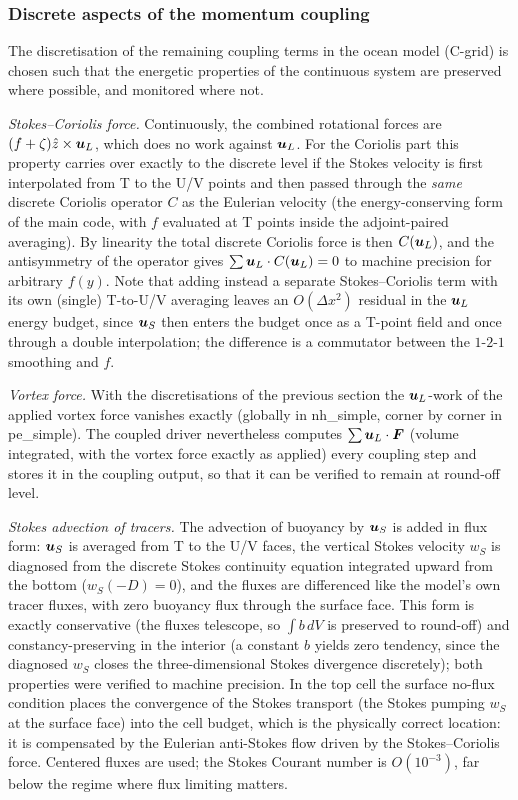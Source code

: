 \documentclass[12pt]{article}
\renewcommand{\v}[1]{{\mbox{\boldmath$ #1 $}}}  %
\begin{document}
\subsubsection*{Discrete aspects of the momentum coupling}

The discretisation of the remaining coupling terms in the ocean model
(C-grid) is chosen such that the energetic properties of the continuous
system are preserved where possible, and monitored where not.

\emph{Stokes--Coriolis force.} Continuously, the combined rotational forces are
$(f+\zeta)\hat z\times\v u_L$, which does no work against $\v u_L$. For the
Coriolis part this property carries over exactly to the discrete level if the
Stokes velocity is first interpolated from T to the U/V points and then passed
through the \emph{same} discrete Coriolis operator $C$ as the Eulerian
velocity (the energy-conserving form of the main code, with $f$ evaluated at
T points inside the adjoint-paired averaging). By linearity the total discrete
Coriolis force is then $C(\v u_L)$, and the antisymmetry of the operator gives
$\sum \v u_L\cdot C(\v u_L)=0$ to machine precision for arbitrary $f(y)$. Note
that adding instead a separate Stokes--Coriolis term with its own (single)
T-to-U/V averaging leaves an $O(\Delta x^2)$ residual in the $\v u_L$ energy
budget, since $\v u_S$ then enters the budget once as a T-point field and once
through a double interpolation; the difference is a commutator between the
$1$-$2$-$1$ smoothing and $f$.

\emph{Vortex force.} With the discretisations of the previous section the
$\v u_L$-work of the applied vortex force vanishes exactly (globally in
nh\_simple, corner by corner in pe\_simple). The coupled driver nevertheless
computes $\sum \v u_L\cdot \v F$ (volume integrated, with the vortex force
exactly as applied) every coupling step and stores it in the coupling
output, so that it can be verified to remain at round-off level.

\emph{Stokes advection of tracers.} The advection of buoyancy by $\v u_S$ is
added in flux form: $\v u_S$ is averaged from T to the U/V faces, the vertical
Stokes velocity $w_S$ is diagnosed from the discrete Stokes continuity
equation integrated upward from the bottom ($w_S(-D)=0$), and the fluxes are
differenced like the model's own tracer fluxes, with zero buoyancy flux
through the surface face. This form is exactly conservative (the fluxes
telescope, so $\int b\,dV$ is preserved to round-off) and
constancy-preserving in the interior (a constant $b$ yields zero tendency,
since the diagnosed $w_S$ closes the three-dimensional Stokes divergence
discretely); both properties were verified to machine precision. In the top
cell the surface no-flux condition places the convergence of the Stokes
transport (the Stokes pumping $w_S$ at the surface face) into the cell budget,
which is the physically correct location: it is compensated by the Eulerian
anti-Stokes flow driven by the Stokes--Coriolis force. Centered fluxes are
used; the Stokes Courant number is $O(10^{-3})$, far below the regime where
flux limiting matters.
\end{document}
